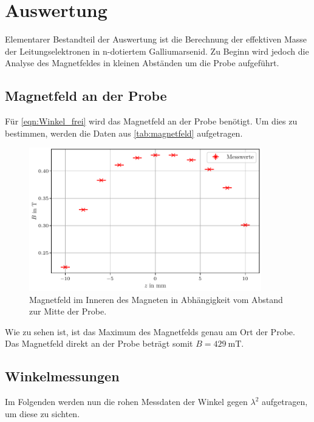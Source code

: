 %

%
\section{Auswertung}
\label{sec:Auswertung}

%
%
%

Elementarer Bestandteil der Auswertung ist die Berechnung der effektiven Masse der Leitungselektronen in n-dotiertem 
Galliumarsenid. Zu Beginn wird jedoch die Analyse des Magnetfeldes in kleinen Abständen um die Probe aufgeführt.

%
%
%
%

\subsection{Magnetfeld an der Probe}
\noindent Für \autoref{eqn:Winkel_frei} wird das Magnetfeld an der Probe benötigt. Um dies zu bestimmen, 
werden die Daten aus \autoref{tab:magnetfeld} aufgetragen.

\begin{figure}[H]
    \centering
    \includegraphics[width = 0.9\textwidth]{Magnetfeld.pdf}
    \caption{Magnetfeld im Inneren des Magneten in Abhängigkeit vom Abstand zur Mitte der Probe.}
    \label{fig:magnetfeld}
\end{figure}

\noindent Wie zu sehen ist, ist das Maximum des Magnetfelds genau am Ort der Probe. Das Magnetfeld 
direkt an der Probe beträgt somit 
%
%
$B=\qty{429}{\milli \tesla}$.
%
%
%

\subsection{Winkelmessungen}
\noindent Im Folgenden werden nun die rohen Messdaten der Winkel gegen $\lambda^2$ aufgetragen, um diese 
zu sichten.


